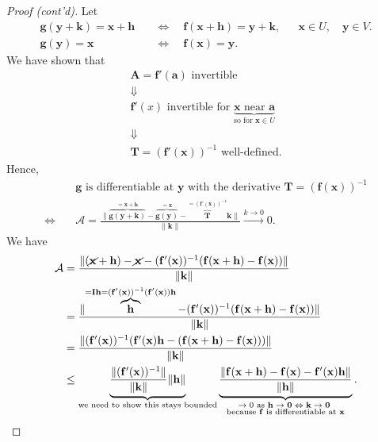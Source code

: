 \documentclass[letterpaper, reqno,11pt]{article}
\begin{document}
\begin{proof}[Proof (cont'd)]
  Let
  \begin{align*}
    \mathbf g(\mathbf y + \mathbf k) = \mathbf x + \mathbf h \quad &\Leftrightarrow \quad \mathbf f(\mathbf x + \mathbf h) = \mathbf y + \mathbf k, && \mathbf x \in U, \quad \mathbf y \in V. \\
    \mathbf g(\mathbf y) = \mathbf x \quad &\Leftrightarrow \quad \mathbf f(\mathbf x) = \mathbf y.
  \end{align*}
  We have shown that
  \begin{gather*}
    \mathbf A = \mathbf f'(\mathbf a) \text{ invertible} \\
    \Downarrow \\
    \mathbf f'(x) \text{ invertible for } \underbrace{\text{$\mathbf x$ near $\mathbf a$}}_\text{so for $\mathbf x \in U$} \\
    \Downarrow \\
    \mathbf T = (\mathbf f'(\mathbf x))^{-1} \text{ well-defined}.
  \end{gather*}
  Hence,
  \begin{align*}
    & \text{$\mathbf g$ is differentiable at $\mathbf y$ with the derivative $\mathbf T = (\mathbf f(\mathbf x))^{-1}$} \\
    \Leftrightarrow \quad & \mathcal A = \boxed{\frac{\lVert \overbrace{\mathbf g(\mathbf y + \mathbf k)}^{= \mathbf x + \mathbf h} - \overbrace{\mathbf g(\mathbf y)}^{= \mathbf x} - \overbrace{\mathbf T}^{= (\mathbf f'(\mathbf x))^{-1}} \mathbf k \rVert}{\lVert \mathbf k \rVert}} \xrightarrow{k \to 0} 0.
  \end{align*}
  We have
  \begin{align*}
    \mathcal A &= \frac{\lVert (\cancel{\mathbf x} + \mathbf h) - \cancel{\mathbf x} - (\mathbf f'(\mathbf x))^{-1} (\mathbf f(\mathbf x + \mathbf h) - \mathbf f(\mathbf x)) \rVert}{\lVert \mathbf k \rVert} \\
    &= \frac{\lVert \overbrace{\mathbf h}^{= \mathbf I \mathbf h = (\mathbf f'(\mathbf x))^{-1} (\mathbf f'(\mathbf x)) \mathbf h} - (\mathbf f'(\mathbf x))^{-1} (\mathbf f(\mathbf x + \mathbf h) - \mathbf f(\mathbf x)) \rVert}{\lVert \mathbf k \rVert} \\
    &= \frac{\lVert (\mathbf f'(\mathbf x))^{-1} (\mathbf f'(\mathbf x) \mathbf h - (\mathbf f(\mathbf x + \mathbf h) - \mathbf f(\mathbf x))) \rVert}{\lVert \mathbf k \rVert} \\
    & \leq \underbrace{\frac{\lVert (\mathbf f'(\mathbf x))^{-1} \rVert}{\lVert \mathbf k \rVert} \lVert \mathbf h \rVert}_\text{we need to show this stays bounded} \underbrace{\frac{\lVert \mathbf f(\mathbf x + \mathbf h) - \mathbf f(\mathbf x) - \mathbf f'(\mathbf x) \mathbf h \rVert}{\lVert \mathbf h \rVert}}_{\substack{\text{$\to 0$ as $\mathbf h \to \mathbf 0 \Leftrightarrow \mathbf k \to \mathbf 0$ } \\ \text{because $\mathbf f$ is differentiable at $\mathbf x$}}}.
  \end{align*}


\end{proof}
\end{document}
